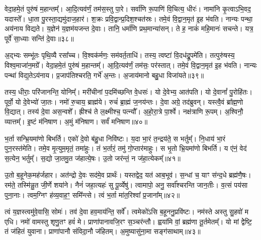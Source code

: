 वेदा॒हमे॒तं पुरु॑षं म॒हान्तम्᳚। 
आ॒दि॒त्यव॑र्णं॒ तम॑स॒स्तु पा॒रे। 
सर्वा॑णि रू॒पाणि॑ वि॒चित्य॒ धीरः॑। 
नामा॑नि कृ॒त्वाऽभि॒वद॒\an{} यदास्ते᳚। 
धा॒ता पु॒रस्ता॒द्यमु॑दाज॒हार॑। 
श॒क्रः प्रवि॒द्वान्प्र॒दिश॒श्चत॑स्रः। 
तमे॒वं वि॒द्वान॒मृत॑ इ॒ह भ॑वति। 
नान्यः पन्था॒ अय॑नाय विद्यते। 
य॒ज्ञेन॑ य॒ज्ञम॑यजन्त दे॒वाः। 
तानि॒ धर्मा॑णि प्रथ॒मान्या॑सन्। 
ते ह॒ नाकं॑ महि॒मानः॑ सचन्ते। 
यत्र॒ पूर्वे॑ सा॒ध्याः सन्ति॑ दे॒वाः॥३८॥

अ॒द्भ्यः सम्भू॑तः पृथि॒व्यै रसा᳚च्च। 
वि॒श्वक॑र्मणः॒ सम॑वर्त॒ताधि॑। 
तस्य॒ त्वष्टा॑ वि॒दध॑द्रू॒पमे॑ति। 
तत्पुरु॑षस्य॒ विश्व॒माजा॑न॒मग्रे᳚। 
वेदा॒हमे॒तं पुरु॑षं म॒हान्तम्᳚। 
आ॒दि॒त्यव॑र्णं॒ तम॑सः॒ पर॑स्तात्। 
तमे॒वं वि॒द्वान॒मृत॑ इ॒ह भ॑वति। 
नान्यः पन्था॑ विद्य॒तेऽय॑नाय। 
प्र॒जाप॑तिश्चरति॒ गर्भे॑ अ॒न्तः। 
अ॒जाय॑मानो बहु॒धा विजा॑यते॥३९॥

तस्य॒ धीराः॒ परि॑जानन्ति॒ योनिम्᳚। 
मरी॑चीनां प॒दमि॑च्छन्ति वे॒धसः॑। 
यो दे॒वेभ्य॒ आत॑पति। 
यो दे॒वानां᳚ पु॒रोहि॑तः। 
पूर्वो॒ यो दे॒वेभ्यो॑ जा॒तः। 
नमो॑ रु॒चाय॒ ब्राह्म॑ये। 
रुचं॑ ब्रा॒ह्मं ज॒नय॑न्तः। 
दे॒वा अग्रे॒ तद॑ब्रुवन्। 
यस्त्वै॒वं ब्रा᳚ह्म॒णो वि॒द्यात्। 
तस्य॑ दे॒वा अस॒न्वशे᳚। 
ह्रीश्च॑ ते ल॒क्ष्मीश्च॒ पत्न्यौ᳚। 
अ॒हो॒रा॒त्रे पा॒र्श्वे। 
नक्ष॑त्राणि रू॒पम्। 
अ॒श्विनौ॒ व्यात्तम्᳚। 
इ॒ष्टं म॑निषाण। 
अ॒मुं म॑निषाण। 
सर्वं॑ मनिषाण॥४०॥
\anuvakamend[जा॒य॒ते॒ वशे॑ स॒प्त च॑]

भ॒र्ता सन्भ्रि॒यमा॑णो बिभर्ति। 
एको॑ दे॒वो ब॑हु॒धा निवि॑ष्टः। 
य॒दा भा॒रं त॒न्द्रय॑ते॒ स भर्तुम्᳚। 
नि॒धाय॑ भा॒रं पुन॒रस्त॑मेति। 
तमे॒व मृ॒त्युम॒मृतं॒ तमा॑हुः। 
तं भ॒र्तारं॒ तमु॑ गो॒प्तार॑माहुः। 
स भृ॒तो भ्रि॒यमा॑णो बिभर्ति। 
य ए॑नं॒ वेद॑ स॒त्येन॒ भर्तुम्᳚। 
स॒द्यो जा॒तमु॒त ज॑हात्ये॒षः। 
उ॒तो जर॑न्तं॒ न ज॑हा॒त्येकम्᳚॥४१॥

उ॒तो ब॒हूनेक॒मह॑र्जहार। 
अत॑न्द्रो दे॒वः सद॑मे॒व प्रार्थः॑। 
यस्तद्वेद॒ यत॑ आब॒भूव॑। 
स॒न्धां च॒ याꣳ स॑न्द॒धे ब्रह्म॑णै॒षः। 
रम॑ते॒ तस्मि॑न्नु॒त जी॒र्णे शया॑ने। 
नैनं॑ जहा॒त्यहः॑ सु पू॒र्व्येषु॑। 
त्वामापो॒ अनु॒ सर्वा᳚श्चरन्ति जान॒तीः। 
व॒त्सं पय॑सा पुना॒नाः। 
त्वम॒ग्निꣳ ह॑व्य॒वाह॒ꣳ॒ समि᳚न्त्से। 
त्वं भ॒र्ता मा॑त॒रिश्वा᳚ प्र॒जाना᳚म्॥४२॥

त्वं य॒ज्ञस्त्वमु॑वे॒वासि॒ सोमः॑। 
तव॑ दे॒वा हव॒माय॑न्ति॒ सर्वे᳚। 
त्वमेको॑ऽसि ब॒हूननु॒प्रवि॑ष्टः। 
नम॑स्ते अस्तु सु॒हवो॑ म एधि। 
नमो॑ वामस्तु शृणु॒तꣳ हवं॑ मे। 
प्राणा॑पानावजि॒रꣳ स॒ञ्चर॑न्तौ। 
ह्वया॑मि वां॒ ब्रह्म॑णा तू॒र्तमेतम्᳚। 
यो मां द्वेेष्टि॒ तं ज॑हितं युवाना। 
प्राणा॑पानौ संविदा॒नौ ज॑हितम्। 
अ॒मुष्यासु॑ना॒मा सङ्ग॑साथाम्॥४३॥

